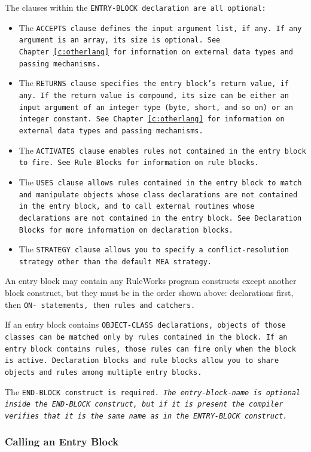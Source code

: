 The clauses within the \tt{ENTRY-BLOCK} declaration are all optional:

\begin{itemize}
\item The \tt{ACCEPTS} clause defines the input argument list, if
  any. If any argument is an array, its size is optional. See
  Chapter~\ref{c:otherlang} for information on external data types and
  passing mechanisms.
\item The \tt{RETURNS} clause specifies the entry block's return
  value, if any. If the return value is compound, its size can be
  either an input argument of an integer type (byte, short, and so on)
  or an integer constant. See Chapter~\ref{c:otherlang} for
  information on external data types and passing mechanisms.
\item The \tt{ACTIVATES} clause enables rules not contained in the
  entry block to fire. See Rule Blocks for information on rule blocks.
\item The \tt{USES} clause allows rules contained in the entry block
  to match and manipulate objects whose class declarations are not
  contained in the entry block, and to call external routines whose
  declarations are not contained in the entry block. See Declaration
  Blocks for more information on declaration blocks.
\item The \tt{STRATEGY} clause allows you to specify a
  conflict-resolution strategy other than the default \tt{MEA}
  strategy.
\end{itemize}
  
An entry block may contain any RuleWorks program constructs except
another block construct, but they must be in the order shown above:
declarations first, then \tt{ON-} statements, then rules and catchers.

If an entry block contains \tt{OBJECT-CLASS} declarations, objects of
those classes can be matched only by rules contained in the block.  If
an entry block contains rules, those rules can fire only when the
block is active.  Declaration blocks and rule blocks allow you to
share objects and rules among multiple entry blocks.

The \tt{END-BLOCK} construct is required. \it{The entry-block-name} is
optional inside the \tt{END-BLOCK} construct, but if it is present the
compiler verifies that it is the same name as in the \tt{ENTRY-BLOCK}
construct.

\subsubsection{Calling an Entry Block}

